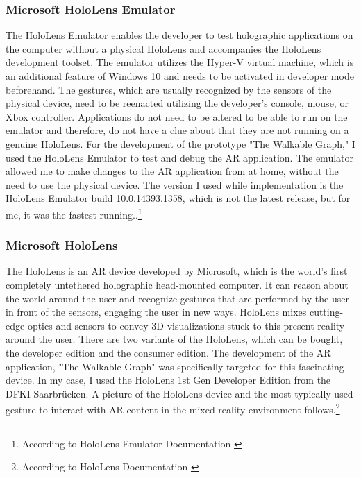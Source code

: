 \documentclass[12pt,a4paper,oneside,american,parskip=half]{article}
\begin{document}
\begin{justify}
\begin{normalsize}
\subsubsection{Microsoft HoloLens Emulator}
The HoloLens Emulator enables the developer to test holographic applications on the computer without a physical HoloLens and accompanies the HoloLens development toolset. The emulator utilizes the Hyper-V virtual machine, which is an additional feature of Windows 10 and needs to be activated in developer mode beforehand. The gestures, which are usually recognized by the sensors of the physical device, need to be reenacted utilizing the developer's console, mouse, or Xbox controller.
Applications do not need to be altered to be able to run on the emulator and therefore, do not have a clue about that they are not running on a genuine HoloLens. For the development of the prototype "The Walkable Graph," I used the HoloLens Emulator to test and debug the AR application. The emulator allowed me to make changes to the AR application from at home, without the need to use the physical device. The version I used while implementation is the HoloLens Emulator build 10.0.14393.1358, which is not the latest release, but for me, it was the fastest running..\footnote{According to HoloLens Emulator Documentation \cite{emulator}}

\subsubsection{Microsoft HoloLens}
The HoloLens is an AR device developed by Microsoft, which is the world's first completely untethered holographic head-mounted computer.
It can reason about the world around the user and recognize gestures that are performed by the user in front of the sensors, engaging the user in new ways.
HoloLens mixes cutting-edge optics and sensors to convey 3D visualizations stuck to this present reality around the user. 
There are two variants of the HoloLens, which can be bought, the developer edition and the consumer edition.
\newline
The development of the AR application, "The Walkable Graph" was specifically targeted for this fascinating device. In my case, I used the HoloLens 1st Gen Developer Edition from the DFKI Saarbrücken. A picture of the HoloLens device and the most typically used gesture to interact with AR content in the mixed reality environment follows.\footnote{According to HoloLens Documentation \cite{holodoc}}


\end{normalsize}
\end{justify}
\end{document}
